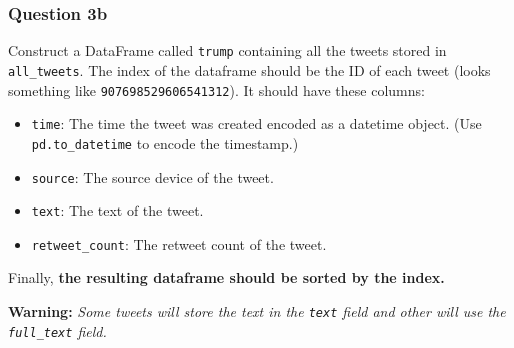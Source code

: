 \documentclass[11pt]{article}
\providecommand{\tightlist}{%
      \setlength{\itemsep}{0pt}\setlength{\parskip}{0pt}}
\begin{document}
    \subsubsection{Question 3b}\label{question-3b}

Construct a DataFrame called \texttt{trump} containing all the tweets
stored in \texttt{all\_tweets}. The index of the dataframe should be the
ID of each tweet (looks something like \texttt{907698529606541312}). It
should have these columns:

\begin{itemize}
\tightlist
\item
  \texttt{time}: The time the tweet was created encoded as a datetime
  object. (Use \texttt{pd.to\_datetime} to encode the timestamp.)
\item
  \texttt{source}: The source device of the tweet.
\item
  \texttt{text}: The text of the tweet.
\item
  \texttt{retweet\_count}: The retweet count of the tweet.
\end{itemize}

Finally, \textbf{the resulting dataframe should be sorted by the index.}

\textbf{Warning:} \emph{Some tweets will store the text in the
\texttt{text} field and other will use the \texttt{full\_text} field.}
\end{document}
